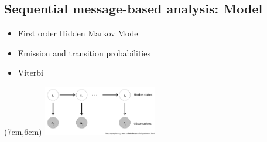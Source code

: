 \documentclass[
paper=128mm:96mm, %
fontsize=11pt, %
pagesize, %
parskip=half-, %
]{scrartcl} %
\newcommand*{\mygreen}[1]{\textcolor{mygreen}{#1}}
\theoremstyle{mythmstyle} %
\newtheorem{theorem}{Theorem}[section] %
\newtheorem{remark}[theorem]{Remark} %
\newtheorem{algorithm}[theorem]{Algorithm} %
\newcommand*{\mybox}[2]{ %
\par\noindent
\begin{tikzpicture}[mynodestyle/.style={rectangle,draw=mygreen,thick,inner sep=2mm,text justified,top color=white,bottom color=white,above}]\node[mynodestyle,at={(0.5*#1+2mm+0.4pt,0)}]{ %
\begin{minipage}[t]{#1}
#2
\end{minipage}
};
\end{tikzpicture}
\par\vspace{-1.3em}}
\begin{document}

\clearpage


\subsection*{Sequential message-based analysis: Model}

\begin{itemize}

\item First order Hidden Markov Model

\item Emission and transition probabilities

\item Viterbi

\end{itemize}

\begin{textblock*}{5cm}(7cm,6cm) %
\includegraphics[width=5cm]{HMM_observations}
\end{textblock*}
\end{document}
